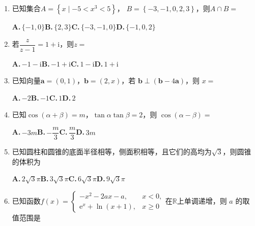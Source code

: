 \documentclass[UTF8,a4paper]{ctexart}
\newcommand{\e}{\mathrm{e}}
\renewcommand{\i}{\mathrm{i}}
\begin{document}
\begin{enumerate}[series=s0, leftmargin=2em, itemsep=0.8em]


\item
已知集合$A=\left\{x\mid-5<x^3<5\right\}$， $B=\left\{-3,-1,0,2,3\right\}$，则$A\cap B=$


\noindent\textbf{A.}\,$\{-1,0\}$\quad\textbf{B.}\,$\{2,3\}$\quad\textbf{C.}\,$\{-3,-1,0\}$\quad\textbf{D.}\,$\{-1,0,2\}$
\par\smallskip





\item
若$\dfrac{z}{z-1}=1+\i$，则$z=$


\noindent\textbf{A.}\,$-1-\i$\quad\textbf{B.}\,$-1+\i$\quad\textbf{C.}\,$1-\i$\quad\textbf{D.}\,$1+\i$
\par\smallskip





\item
已知向量$\boldsymbol a=(0,1)$，$\boldsymbol b=(2,x)$，若 $\boldsymbol b\perp (\boldsymbol b-4\boldsymbol a)$，则 $x=$


\noindent\textbf{A.}\,$-2$\quad\textbf{B.}\,$-1$\quad\textbf{C.}\,$1$\quad\textbf{D.}\,$2$
\par\smallskip





\item
已知$\cos(\alpha+\beta)=m$，$\tan\alpha\tan\beta=2$，则 $\cos(\alpha-\beta)=$


\noindent\textbf{A.}\,$-3m$\quad\textbf{B.}\,$-\dfrac{m}{3}$\quad\textbf{C.}\,$\dfrac{m}{3}$\quad\textbf{D.}\,$3m$
\par\smallskip





\item
已知圆柱和圆锥的底面半径相等，侧面积相等，且它们的高均为$\sqrt 3$，则圆锥的体积为


\noindent\textbf{A.}\,$2\sqrt 3\pi$\quad\textbf{B.}\,$3\sqrt 3\pi$\quad\textbf{C.}\,$6\sqrt 3\pi$\quad\textbf{D.}\,$9\sqrt 3\pi$
\par\smallskip





\item
已知函数$f(x)=\begin{cases}-x^2-2ax-a, &x<0, \\ \e^x+\ln(x+1), &x\geqslant 0\end{cases}$在$\mathbb R$上单调递增，则 $a$ 的取值范围是



\end{enumerate}
\end{document}
